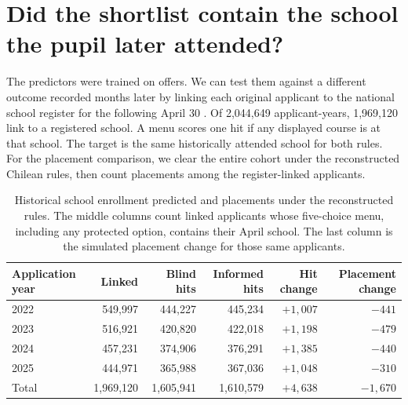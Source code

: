 \section{Did the shortlist contain the school the pupil later attended?}\label{sec:observed-search}
The predictors were trained on offers. We can test them against a different outcome recorded months later by linking each original applicant to the national school register for the following April 30 \citep{registerdata}. Of 2,044,649 applicant-years, 1,969,120 link to a registered school. A menu scores one hit if any displayed course is at that school. The target is the same historically attended school for both rules. For the placement comparison, we clear the entire cohort under the reconstructed Chilean rules, then count placements among the register-linked applicants.

\begin{table}[ht]\centering\small
\caption{Historical school enrollment predicted and placements under the reconstructed rules. The middle columns count linked applicants whose five-choice menu, including any protected option, contains their April school. The last column is the simulated placement change for those same applicants.}\label{tab:enrolled-target}
\begin{tabular}{@{}lrrrrr@{}}\toprule
Application year & Linked & Blind hits & Informed hits & Hit change & Placement change\\\midrule
2022 & 549,997 & 444,227 & 445,234 & $+1,007$ & $-441$\\
2023 & 516,921 & 420,820 & 422,018 & $+1,198$ & $-479$\\
2024 & 457,231 & 374,906 & 376,291 & $+1,385$ & $-440$\\
2025 & 444,971 & 365,988 & 367,036 & $+1,048$ & $-310$\\\midrule
Total & 1,969,120 & 1,605,941 & 1,610,579 & $+4,638$ & $-1,670$\\\bottomrule
\end{tabular}
\end{table}

